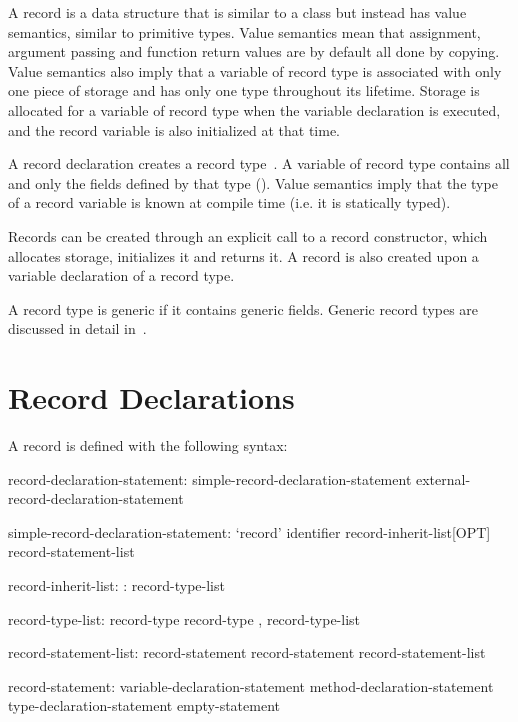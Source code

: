 \label{Records}

A record is a data structure that is similar to a class but instead has value
semantics, similar to primitive types.  Value semantics mean that assignment, argument passing and function
return values are by default all done by copying.  Value semantics also imply that a
variable of record type is associated with only one piece of storage and has
only one type throughout its lifetime.  Storage is allocated for a variable of
record type when the variable declaration is executed, and the record variable
is also initialized at that time.

A record declaration creates a record type~.  A
variable of record type contains all and only the fields defined by that type
().  Value semantics imply that the type of a record variable
is known at compile time (i.e. it is statically typed).  

Records can be created through an explicit call to a record
constructor, which allocates storage, initializes
it and returns it.  
A record is also created upon a variable declaration of a record type.

A record type is generic if it contains generic fields.  Generic record types
are discussed in detail in~.

\section{Record Declarations}
\label{Record_Declarations}

A record is defined with the following syntax:
\begin{syntax}
record-declaration-statement:
  simple-record-declaration-statement
  external-record-declaration-statement

simple-record-declaration-statement:
  `record' identifier record-inherit-list[OPT] { record-statement-list }

record-inherit-list:
  : record-type-list

record-type-list:
  record-type
  record-type , record-type-list

record-statement-list:
  record-statement
  record-statement record-statement-list

record-statement:
  variable-declaration-statement
  method-declaration-statement
  type-declaration-statement
  empty-statement
\end{syntax}

